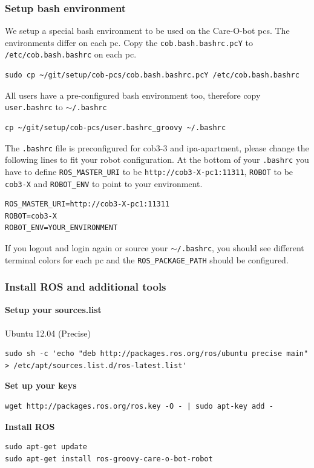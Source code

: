 \subsubsection{Setup bash environment}
We setup a special bash environment to be used on the Care-O-bot pcs. The environments differ on each pc. Copy the \texttt{cob.bash.bashrc.pcY} to \texttt{/etc/cob.bash.bashrc} on each pc.

\begin{lstlisting}
sudo cp ~/git/setup/cob-pcs/cob.bash.bashrc.pcY /etc/cob.bash.bashrc
\end{lstlisting}

All users have a pre-configured bash environment too, therefore copy \texttt{user.bashrc} to \texttt{$\sim$/.bashrc}
\begin{lstlisting}
cp ~/git/setup/cob-pcs/user.bashrc_groovy ~/.bashrc
\end{lstlisting}
The \texttt{.bashrc} file is preconfigured for cob3-3 and ipa-apartment, please change the following lines to fit your robot configuration. At the bottom of your \texttt{.bashrc} you have to define \texttt{ROS\_MASTER\_URI} to be \texttt{http://cob3-X-pc1:11311}, \texttt{ROBOT} to be \texttt{cob3-X} and \texttt{ROBOT\_ENV} to point to your environment.
\begin{lstlisting}
ROS_MASTER_URI=http://cob3-X-pc1:11311
ROBOT=cob3-X
ROBOT_ENV=YOUR_ENVIRONMENT
\end{lstlisting}

If you logout and login again or source your \texttt{$\sim$/.bashrc}, you should see different terminal colors for each pc and the \texttt{ROS\_PACKAGE\_PATH} should be configured. 

\subsubsection{Install ROS and additional tools}


\textbf{Setup your sources.list}
\\
\\Ubuntu 12.04 (Precise)
\begin{lstlisting}
sudo sh -c 'echo "deb http://packages.ros.org/ros/ubuntu precise main" > /etc/apt/sources.list.d/ros-latest.list'
\end{lstlisting}
\textbf{Set up your keys}
\begin{lstlisting}
wget http://packages.ros.org/ros.key -O - | sudo apt-key add -
\end{lstlisting}
\textbf{Install ROS}
\begin{lstlisting}
sudo apt-get update
sudo apt-get install ros-groovy-care-o-bot-robot
\end{lstlisting}

